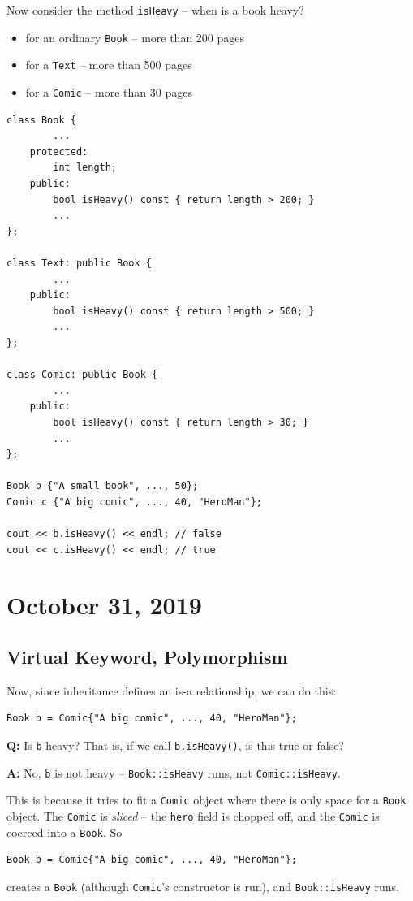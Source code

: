 \documentclass[11pt]{article}
\theoremstyle{definition}
\begin{document}
Now consider the method {\tt isHeavy} -- when is a book heavy?\vspace{-0.25cm}
\begin{itemize}
    \item for an ordinary {\tt Book} -- more than 200 pages
    \item for a {\tt Text} -- more than 500 pages
    \item for a {\tt Comic} -- more than 30 pages
\end{itemize}
\vspace{-0.25cm}
\begin{lstlisting}
class Book {
        ...
    protected: 
        int length;
    public:
        bool isHeavy() const { return length > 200; }
        ...
};

class Text: public Book {
        ...
    public:
        bool isHeavy() const { return length > 500; }
        ...
};

class Comic: public Book {
        ...
    public:
        bool isHeavy() const { return length > 30; }
        ...
};

Book b {"A small book", ..., 50};
Comic c {"A big comic", ..., 40, "HeroMan"};

cout << b.isHeavy() << endl; // false
cout << c.isHeavy() << endl; // true
\end{lstlisting}
\vspace{-0.25cm}
\newpage

\section{October 31, 2019}

\subsection{Virtual Keyword, Polymorphism}
Now, since inheritance defines an is-a relationship, we can do this:
\begin{lstlisting}
Book b = Comic{"A big comic", ..., 40, "HeroMan"};
\end{lstlisting}
\vspace{-0.25cm}
{\bf Q:} Is {\tt b} heavy? That is, if we call {\tt b.isHeavy()}, is this true or false?

{\bf A:} No, {\tt b} is not heavy -- {\tt Book::isHeavy} runs, not {\tt Comic::isHeavy}.

This is because it tries to fit a {\tt Comic} object where there is only space for a {\tt Book} object. The {\tt Comic} is {\it sliced} -- the {\tt hero} field is chopped off, and the {\tt Comic} is coerced into a {\tt Book}. So 
\begin{lstlisting}
Book b = Comic{"A big comic", ..., 40, "HeroMan"};
\end{lstlisting}
\vspace{-0.25cm}
creates a {\tt Book} (although {\tt Comic}'s constructor is run), and {\tt Book::isHeavy} runs.
\end{document}

